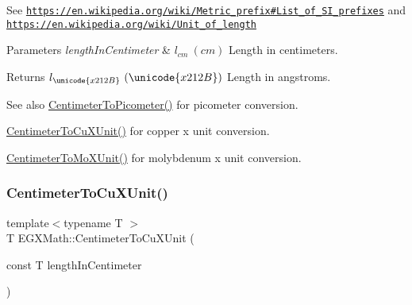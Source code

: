 See \href{https://en.wikipedia.org/wiki/Metric_prefix#List_of_SI_prefixes}{\tt https\+://en.\+wikipedia.\+org/wiki/\+Metric\+\_\+prefix\#\+List\+\_\+of\+\_\+\+S\+I\+\_\+prefixes} and \href{https://en.wikipedia.org/wiki/Unit_of_length}{\tt https\+://en.\+wikipedia.\+org/wiki/\+Unit\+\_\+of\+\_\+length} 
\begin{DoxyParams}{Parameters}
{\em length\+In\+Centimeter} & $ l_{cm}\ (cm)$ Length in centimeters. \\
\hline
\end{DoxyParams}
\begin{DoxyReturn}{Returns}
$ l_{\unicode{x212B}}\ (\unicode{x212B})$ Length in angstroms. 
\end{DoxyReturn}
\begin{DoxySeeAlso}{See also}
\mbox{\hyperlink{group___e_g_x_math-_conversions-_length_conversions-_centimeter-_s_i_ga7e2851b0052f1b135a84aa860495e4ba}{Centimeter\+To\+Picometer()}} for picometer conversion. 

\mbox{\hyperlink{group___e_g_x_math-_conversions-_length_conversions-_centimeter-_non-_s_i_ga98d44269c80a1c5ab7c38d27aba39517}{Centimeter\+To\+Cu\+X\+Unit()}} for copper x unit conversion. 

\mbox{\hyperlink{group___e_g_x_math-_conversions-_length_conversions-_centimeter-_non-_s_i_ga4e94aa6f1cc6aaeb751384a8472b01fd}{Centimeter\+To\+Mo\+X\+Unit()}} for molybdenum x unit conversion. 
\end{DoxySeeAlso}
\mbox{\label{group___e_g_x_math-_conversions-_length_conversions-_centimeter-_non-_s_i_ga98d44269c80a1c5ab7c38d27aba39517}} 
\subsubsection{\texorpdfstring{Centimeter\+To\+Cu\+X\+Unit()}{CentimeterToCuXUnit()}}
{\footnotesize\ttfamily template$<$typename T $>$ \\
T E\+G\+X\+Math\+::\+Centimeter\+To\+Cu\+X\+Unit (\begin{DoxyParamCaption}\item[{const T}]{length\+In\+Centimeter }\end{DoxyParamCaption})}



